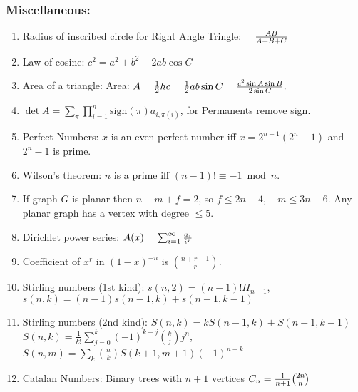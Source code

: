 \documentclass[12pt]{extarticle}
\begin{document}
\begin{multicols*}{2}
			\subsubsection*{Miscellaneous:}
			\begin{enumerate}
				\itemsep0em 
				\item 			Radius of inscribed circle for Right Angle Tringle:
				$\quad {A B \over A + B + C}$
				\item Law of cosine: 			$c^2 = a^2 + b^2 - 2ab \cos C$
				\item Area of a triangle: Area:
				$A = \frac{1}{2} h c
					= \frac{1}{2} a b \sin C
					= {c^2 \sin A \sin B \over 2 \sin C}.$
				\item 			$\det A = \sum_\pi \prod_{i=1}^n \text{sign}(\pi) a_{i,\pi(i)}$, 
				for Permanents remove sign.
				\item Perfect Numbers: $x$ is an even perfect number iff $x = 2^{n-1}(2^n - 1)$ and $2^n - 1$ is prime.
				\item Wilson's theorem: $n$ is a prime iff
				$(n-1)! \equiv -1 \bmod n.$
				\item If graph $G$ is planar then $n - m + f = 2$, so
				$f \leq 2n - 4, \quad m \leq 3 n - 6.$
				Any planar graph has a vertex with degree $\leq 5$.
				\item Dirichlet power series:
				$A(x) =\sum_{i=1}^\infty{a_i \over i^x}$
				\item Coefficient of $x^r$ in $(1-x)^{-n}$ is ${n+r-1}\choose{r}$.
				\item Stirling numbers (1st kind): 
				\newline $s(n,2) = (n-1)!H_{n-1}$, \quad
				$s(n,k) = (n-1) s({n-1},k) + s({n-1},{k-1})$
				\item Stirling numbers (2nd kind): \quad $ S(n,k) = k S(n-1,k) + S(n-1,k-1)$
	\newline $ S(n,k) = \frac{1}{k!}\sum\limits_{j=0}^{k}(-1)^{k-j}\binom{k}{j}j^n $, \quad $S(n,m) = \sum_k {n \choose k} S({k+1},{m+1})(-1)^{n-k}$
				\item Catalan Numbers: Binary trees with $n+1$ vertices \quad $C_n = {1\over n+1}{2n \choose n}$
			\end{enumerate}

\end{multicols*}
\end{document}
